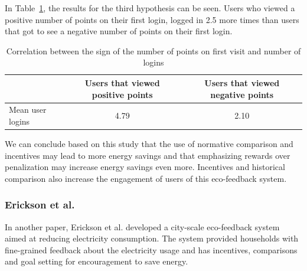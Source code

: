 \documentclass[journal]{vgtc}                %
\begin{document}
In Table~\ref{hypo3}, the results for the third hypothesis can be seen. Users who viewed a positive number of points on their first login, logged in 2.5 more times than users that got to see a negative number of points on their first login. \\

\begin{table}
  \caption{Correlation between the sign of the number of points on first visit and number of logins \cite{jain2012assessing}}
  \label{hypo3}
  \scriptsize
  \begin{center}
    \begin{tabular}{lcc}
    \multicolumn{1}{p{2cm}}{\centering } &
       \multicolumn{1}{p{2cm}}{\centering Users that viewed positive points} &
       \multicolumn{1}{p{2cm}}{\centering Users that viewed negative points} \\
    \hline
      Mean user logins &  4.79 & 2.10\\
    \end{tabular}
  \end{center}
\end{table}

We can conclude based on this study that the use of normative comparison and incentives may lead to more energy savings and that emphasizing rewards over penalization may increase energy savings even more. 
Incentives and historical comparison also increase the engagement of users of this eco-feedback system.\\

\subsubsection{Erickson et al.}
In another paper, Erickson et al. \cite{erickson2013dubuque} developed a city-scale eco-feedback system aimed at reducing electricity consumption. The system provided households with fine-grained feedback about the electricity usage and has incentives, comparisons and goal setting for encouragement to save energy. \\
\end{document}
